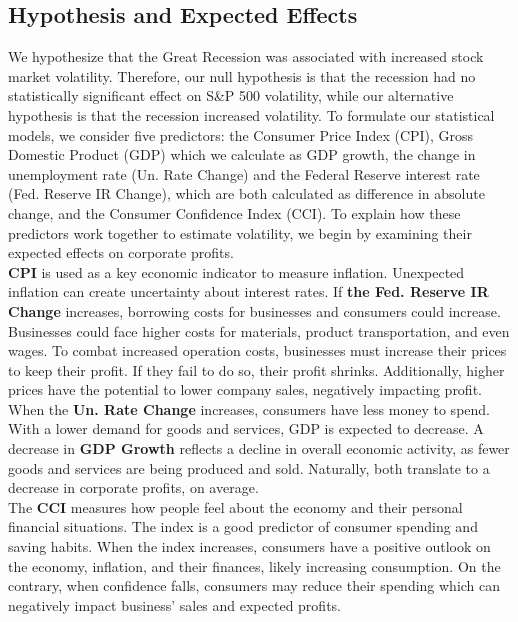 \subsection{Hypothesis and Expected Effects}
We hypothesize that the Great Recession was associated with increased stock market volatility. Therefore, our null hypothesis is that the recession had no statistically significant effect on S\&P 500 volatility, while our alternative hypothesis is that the recession increased volatility. To formulate our statistical models, we consider five predictors: the Consumer Price Index (CPI), Gross Domestic Product (GDP) which we calculate as GDP growth,  the change in unemployment rate (Un. Rate Change) and the Federal Reserve interest rate (Fed. Reserve IR Change), which are both calculated as difference in absolute change, and the Consumer Confidence Index (CCI). To explain how these predictors work together to estimate volatility, we begin by examining their expected effects on corporate profits. \\
\indent \textbf{CPI} is used as a key economic indicator to measure inflation. Unexpected inflation can create uncertainty about interest rates. If \textbf{the Fed. Reserve IR Change} increases, borrowing costs for businesses and consumers could increase. Businesses could face higher costs for materials, product transportation, and even wages. To combat increased operation costs, businesses must increase their prices to keep their profit. If they fail to do so, their profit shrinks. Additionally, higher prices have the potential to lower company sales, negatively impacting profit. \\
\indent When the \textbf{Un. Rate Change} increases, consumers have less money to spend. With a lower demand for goods and services, GDP is expected to decrease. A decrease in \textbf{GDP Growth} reflects a decline in overall economic activity, as fewer goods and services are being produced and sold. Naturally, both translate to a decrease in corporate profits, on average.  \\
\indent The \textbf{CCI} measures how people feel about the economy and their personal financial situations. The index is a good predictor of consumer spending and saving habits. When the index increases, consumers have a positive outlook on the economy, inflation, and their finances, likely increasing consumption. On the contrary, when confidence falls, consumers may reduce their spending which can negatively impact business’ sales and expected profits. \\
